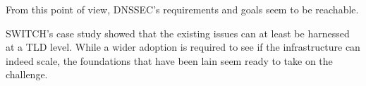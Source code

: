 \documentclass[a4paper,twocolumn]{scrartcl}
\begin{document}
From this point of view, DNSSEC's requirements and goals seem to be reachable.

SWITCH's case study showed that the existing issues can at least be harnessed at a TLD level. While a wider adoption is required to see if the infrastructure can indeed scale, the foundations that have been lain seem ready to take on the challenge.

\nocite{*}


\end{document}
